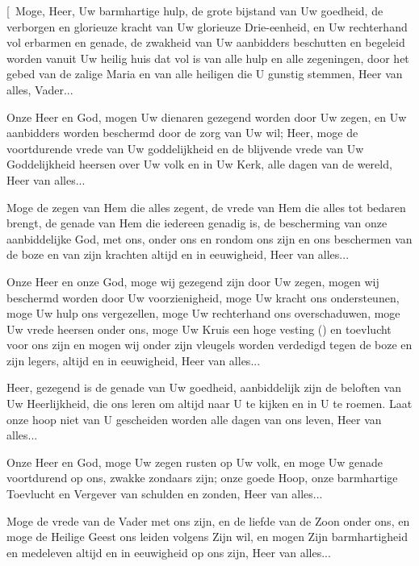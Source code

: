 \documentclass[12pt,twoside,a5paper]{article}
\begin{document}
\begin{halfparskip}
  [\cc~Moge, Heer, Uw barmhartige hulp, de grote bijstand van Uw goedheid, de verborgen en glorieuze kracht van Uw glorieuze Drie-eenheid, en Uw rechterhand vol erbarmen en genade, de zwakheid van Uw aanbidders beschutten en begeleid worden vanuit Uw heilig huis dat vol is van alle hulp en alle zegeningen, door het gebed van de zalige Maria en van alle heiligen die U gunstig stemmen, Heer van alles, Vader...

   Onze Heer en God, mogen Uw dienaren gezegend worden door Uw zegen, en Uw aanbidders worden beschermd door de zorg van Uw wil; Heer, moge de voortdurende vrede van Uw goddelijkheid en de blijvende vrede van Uw Goddelijkheid heersen over Uw volk en in Uw Kerk, alle dagen van de wereld, Heer van alles...

   Moge de zegen van Hem die alles zegent, de vrede van Hem die alles tot bedaren brengt, de genade van Hem die iedereen genadig is, de bescherming van onze aanbiddelijke God, met ons, onder ons en rondom ons zijn en ons beschermen van de boze en van zijn krachten altijd en in eeuwigheid, Heer van alles...

   Onze Heer en onze God, moge wij gezegend zijn door Uw zegen, mogen wij beschermd worden door Uw voorzienigheid, moge Uw kracht ons ondersteunen, moge Uw hulp ons vergezellen, moge Uw rechterhand ons overschaduwen, moge Uw vrede heersen onder ons, moge Uw Kruis een hoge vesting () en toevlucht voor ons zijn en mogen wij onder zijn vleugels worden verdedigd tegen de boze en zijn legers, altijd en in eeuwigheid, Heer van alles...

   Heer, gezegend is de genade van Uw goedheid, aanbiddelijk zijn de beloften van Uw Heerlijkheid, die ons leren om altijd naar U te kijken en in U te roemen. Laat onze hoop niet van U gescheiden worden alle dagen van ons leven, Heer van alles...

   Onze Heer en God, moge Uw zegen rusten op Uw volk, en moge Uw genade voortdurend op ons, zwakke zondaars zijn; onze goede Hoop, onze barmhartige Toevlucht en Vergever van schulden en zonden, Heer van alles...

   Moge de vrede van de Vader met ons zijn, en de liefde van de Zoon onder ons, en moge de Heilige Geest ons leiden volgens Zijn wil, en mogen Zijn barmhartigheid en medeleven altijd en in eeuwigheid op ons zijn, Heer van alles...


\end{halfparskip}
\end{document}
